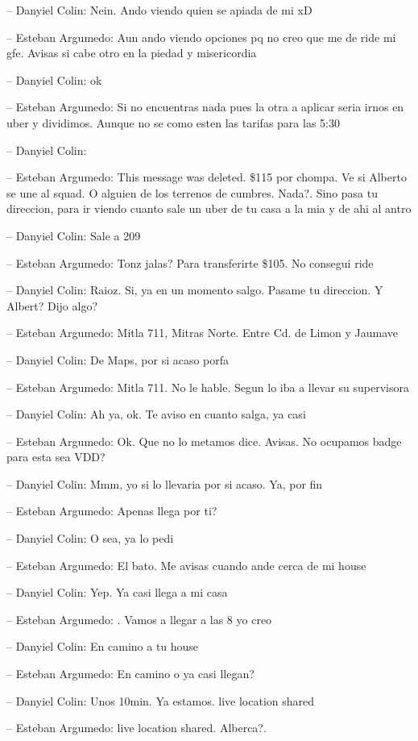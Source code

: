 -- Danyiel Colin: Nein. Ando viendo quien se apiada de mi xD

-- Esteban Argumedo: Aun ando viendo opciones pq no creo que me de ride
mi gfe. Avisas si cabe otro en la piedad y misericordia

-- Danyiel Colin: ok

-- Esteban Argumedo: Si no encuentras nada pues la otra a aplicar seria
irnos en uber y dividimos. Aunque no se como esten las tarifas para las
5:30

-- Danyiel Colin:

-- Esteban Argumedo: This message was deleted. \$115 por chompa. Ve si
Alberto se une al squad. O alguien de los terrenos de cumbres. Nada?.
Sino pasa tu direccion, para ir viendo cuanto sale un uber de tu casa a
la mia y de ahi al antro

-- Danyiel Colin: Sale a 209

-- Esteban Argumedo: Tonz jalas? Para transferirte \$105. No consegui
ride

-- Danyiel Colin: Raioz. Si, ya en un momento salgo. Pasame tu
direccion. Y Albert? Dijo algo?

-- Esteban Argumedo: Mitla 711, Mitras Norte. Entre Cd. de Limon y
Jaumave

-- Danyiel Colin: De Maps, por si acaso porfa

-- Esteban Argumedo: Mitla 711. No le hable. Segun lo iba a llevar su
supervisora

-- Danyiel Colin: Ah ya, ok. Te aviso en cuanto salga, ya casi

-- Esteban Argumedo: Ok. Que no lo metamos dice. Avisas. No ocupamos
badge para esta sea VDD?

-- Danyiel Colin: Mmm, yo si lo llevaria por si acaso. Ya, por fin

-- Esteban Argumedo: Apenas llega por ti?

-- Danyiel Colin: O sea, ya lo pedi

-- Esteban Argumedo: El bato. Me avisas cuando ande cerca de mi house

-- Danyiel Colin: Yep. Ya casi llega a mi casa

-- Esteban Argumedo: . Vamos a llegar a las 8 yo creo

-- Danyiel Colin: En camino a tu house

-- Esteban Argumedo: En camino o ya casi llegan?

-- Danyiel Colin: Unos 10min. Ya estamos. live location shared

-- Esteban Argumedo: live location shared. Alberca?.

